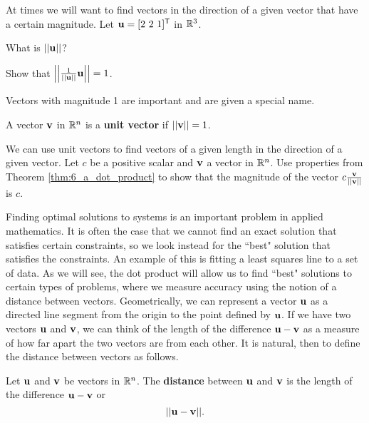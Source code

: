 \begin{pa}
	\ea
	
\item At times we will want to find vectors in the direction of a given vector that have a certain magnitude. Let $\mathbf{u} = [2 \ 2 \ 1]^{\mathsf{T}}$ in $\mathbb{R}^3$.
	\ba
	\item What is $|| \mathbf{u} ||$? 

	\item Show that $\left| \left| \frac{1}{||\mathbf{u}||} \mathbf{u} \right| \right| = 1$. 

	
	\item Vectors with magnitude 1 are important and are given a special name.

\begin{definition} \label{def:6_a_unit_vector} A vector $\mathbf{v}$ in $\mathbb{R}^n$ is a \textbf{unit vector} if $|| \mathbf{v} || = 1$.
\end{definition}

We can use unit vectors to find vectors of a given length in the direction of a given vector. Let $c$ be a positive scalar and $\mathbf{v}$ a vector in $\mathbb{R}^n$. Use properties from Theorem \ref{thm:6_a_dot_product} to show that the magnitude of the vector $c \frac{\mathbf{v}}{||\mathbf{v}||}$ is $c$. 

	\ea
		

\ee

\end{pa}



Finding optimal solutions to systems is an important problem in applied mathematics. It is often the case that we cannot find an exact solution that satisfies certain constraints, so we look instead for the ``best" solution that satisfies the constraints. An example of this is fitting a least squares line to a set of data. As we will see, the dot product will allow us to find ``best" solutions to certain types of problems, where we measure accuracy using the notion of a distance between vectors. Geometrically, we can represent a vector $\mathbf{u}$ as a directed line segment from the origin to the point defined by $\mathbf{u}$. If we have two vectors $\mathbf{u}$ and $\mathbf{v}$, we can think of the length of the difference $\mathbf{u} - \mathbf{v}$ as a measure of how far apart the two vectors are from each other. It is natural, then to define the distance between vectors as follows.

\begin{definition} \label{def:6_a_distance} Let $\mathbf{u}$ and $\mathbf{v}$ be vectors in $\mathbb{R}^n$. The \textbf{distance} between $\mathbf{u}$ and $\mathbf{v}$ is the length of the difference $\mathbf{u} - \mathbf{v}$ or
\[|| \mathbf{u} - \mathbf{v} ||.\]
\end{definition}


